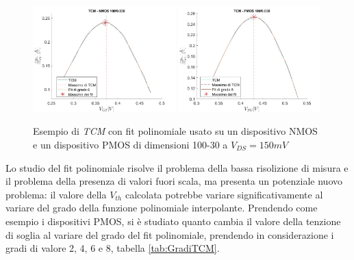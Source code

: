 \documentclass[12pt, letterpaper]{book}
\begin{document}
\begin{figure}[H]
  \centering
  \includegraphics[width=0.49\textwidth]{TCM-N4-100-30}
  \includegraphics[width=0.49\textwidth]{TCM-P1-100-30}
  \caption{Esempio di \emph{TCM} con fit polinomiale usato su un dispositivo NMOS e un dispositivo PMOS di dimensioni 100-30 a $V_{DS} = 150 mV$}
\end{figure}

Lo studio del fit polinomiale risolve il problema della bassa risolizione di misura e il problema della presenza di valori fuori scala, ma presenta un potenziale nuovo problema: il valore della $V_{th}$ calcolata potrebbe variare significativamente al variare del grado della funzione polinomiale interpolante.
Prendendo come esempio i dispositivi PMOS, si è studiato quanto cambia il valore della tenzione di soglia al variare del grado del fit polinomiale, prendendo in considerazione i gradi di valore 2, 4, 6 e 8, tabella \ref{tab:GradiTCM}.\\
\end{document}
